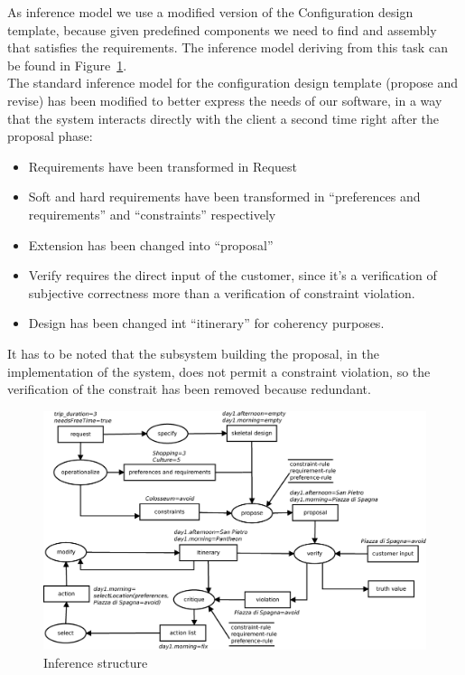 \documentclass[11pt]{article} %
\begin{document}
As inference model we use a modified version of the Configuration design template, because given predefined components we need to find and assembly that satisfies the requirements. The inference model deriving from this task can be found in Figure~\ref{fig:inference}. \\
The standard inference model for the configuration design template (propose and revise) has been modified to better express the needs of our software, in a way that the system interacts directly with the client a second time right after the proposal phase: 
\begin{itemize}
\item Requirements have been transformed in Request
\item Soft and hard requirements have been transformed in ``preferences and requirements'' and ``constraints'' respectively
\item Extension has been changed into ``proposal''
\item Verify requires the direct input of the customer, since it's a verification of subjective correctness more than a verification of constraint violation. 
\item Design has been changed int ``itinerary'' for coherency purposes.
\end{itemize}
It has to be noted that the subsystem building the proposal, in the implementation of the system, does not permit a constraint violation, so the verification of the constrait has been removed because redundant.

\begin{figure}[h]
\centering
\includegraphics[width=\textwidth]{images/inference.eps}
\caption{Inference structure}
\label{fig:inference}
\end{figure}
\end{document}
